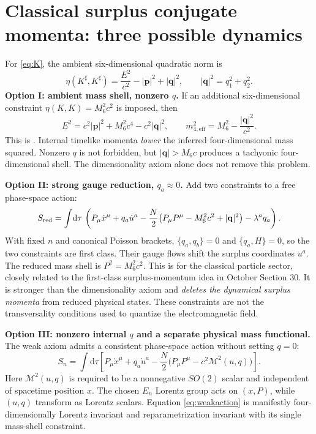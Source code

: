 \documentclass[10.5pt,a4paper]{article}
\newcommand{\dd}{\mathrm d}
\newcommand{\mm}{\mathcal M}
\newcommand{\st}[1]{\textcolor{muted}{\small\sffamily [#1]}}
\begin{document}
\section{Classical surplus conjugate momenta: three possible dynamics}
For \eqref{eq:K}, the ambient six-dimensional quadratic norm is
\begin{equation}\label{eq:eta6}
 \eta(K^\sharp,K^\sharp)=\frac{E^2}{c^2}-|\mathbf p|^2+|\mathbf q|^2,
 \qquad |\mathbf q|^2=q_1^2+q_2^2.
\end{equation}
\textbf{Option I: ambient mass shell, nonzero $q$.} If an additional six-dimensional constraint $\eta(K,K)=M_6^2c^2$ is imposed, then
\begin{equation}\label{eq:minus}
 \boxed{E^2=c^2|\mathbf p|^2+M_6^2c^4-c^2|\mathbf q|^2},\qquad
 m_{4,\mathrm{eff}}^2=M_6^2-\frac{|\mathbf q|^2}{c^2}.
\end{equation}
This is \st{Proved, conditional on the ambient shell}. Internal timelike momenta \emph{lower} the inferred four-dimensional mass squared. Nonzero $q$ is not forbidden, but $|\mathbf q|>M_6c$ produces a tachyonic four-dimensional shell. The dimensionality axiom alone does not remove this problem.

\textbf{Option II: strong gauge reduction, $q_a\approx0$.} Add two constraints to a free phase-space action:
\begin{equation}\label{eq:strong}
 S_{\rm red}=\int\!\dd\tau\,\left(P_\mu\dot x^\mu+q_a\dot u^a
 -\frac{N}{2}\bigl(P_\mu P^\mu-M_6^2c^2+|\mathbf q|^2\bigr)-\lambda^a q_a\right).
\end{equation}
With fixed $n$ and canonical Poisson brackets, $\{q_a,q_b\}=0$ and $\{q_a,H\}=0$, so the two constraints are first class. Their gauge flows shift the surplus coordinates $u^a$. The reduced mass shell is $P^2=M_6^2c^2$. This is \st{Constructed} for the classical particle sector, closely related to the first-class surplus-momentum idea in October Section 30. It is stronger than the dimensionality axiom and \emph{deletes the dynamical surplus momenta} from reduced physical states. These constraints are not the transversality conditions used to quantize the electromagnetic field.

\textbf{Option III: nonzero internal $q$ and a separate physical mass functional.} The weak axiom admits a consistent phase-space action without setting $q=0$:
\begin{equation}\label{eq:weakaction}
 \boxed{S_n=\int\!\dd\tau\left[P_\mu\dot x^\mu+q_a\dot u^a
 -\frac{N}{2}\big(P_\mu P^\mu-c^2\mm^2(u,q)\big)\right].}
\end{equation}
Here $\mm^2(u,q)$ is required to be a nonnegative $SO(2)$ scalar and independent of spacetime position $x$. The chosen $E_n$ Lorentz group acts on $(x,P)$, while $(u,q)$ transform as Lorentz scalars. Equation \eqref{eq:weakaction} is manifestly four-dimensionally Lorentz invariant and reparametrization invariant with its single mass-shell constraint.
\end{document}
